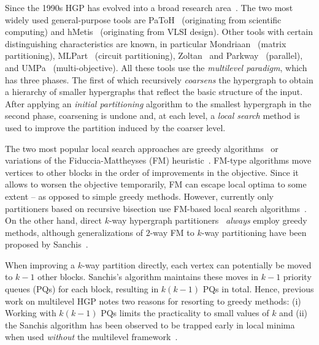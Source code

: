 \documentclass[runningheads,a4paper]{llncs}
\begin{document}
Since the 1990s HGP has evolved into a broad research area~\cite{Alpert19951,DBLP:conf/dimacs/2012,Papa2007}. 
The two most widely used general-purpose tools are PaToH~\cite{PaToH} (originating from scientific computing) 
and hMetis~\cite{hMetisRB,hMetisKway} (originating from VLSI design). 
Other tools with certain distinguishing characteristics are known, in particular Mondriaan~\cite{Mondriaan} (matrix 
partitioning), MLPart~\cite{MLPart} (circuit partitioning), Zoltan~\cite{Zoltan} and Parkway~\cite{Parkway2.0} (parallel), 
and UMPa~\cite{DBLP:conf/dimacs/CatalyurekDKU12} (multi-objective).
All these tools use the \emph{multilevel paradigm}, which  has three phases. The first of which recursively \emph{coarsens} 
the hypergraph to obtain a hierarchy of smaller hypergraphs that reflect the basic structure of the input. After 
applying an \emph{initial partitioning} algorithm to the smallest hypergraph in the second phase, coarsening is 
undone and, at each level, a \emph{local search} method is used to improve the partition induced by the coarser level.

The two most popular local search approaches are greedy algorithms~\cite{hMetisKway,DBLP:conf/dimacs/CatalyurekDKU12} or variations of
the Fiduccia-Mattheyses (FM) heuristic~\cite{FM82}. FM-type algorithms move vertices to other 
blocks in the order of improvements in the objective. Since it allows to worsen the objective temporarily, FM can escape
local optima to some extent -- as opposed to simple greedy methods. However, currently only partitioners based on recursive bisection 
use FM-based local search algorithms~\cite{MLPart,PaToH,Zoltan,hMetisRB,Mondriaan}. On the other hand, direct $k$-way hypergraph 
partitioners~\cite{Aykanat:2008,hMetisKway,Parkway2.0,DBLP:conf/dimacs/CatalyurekDKU12} \emph{always} employ greedy methods, although generalizations of $2$-way FM to $k$-way partitioning have been proposed by Sanchis~\cite{HypergraphKFM}. 

When improving a $k$-way partition directly, each vertex can potentially be moved to $k-1$ other blocks. Sanchis's algorithm maintains these
moves in $k-1$ priority queues (PQs) for each block, resulting in $k(k-1)$ PQs in total.
Hence, previous work on multilevel HGP notes two reasons for resorting to greedy methods: 
(i) Working with $k(k-1)$ PQs limits the practicality to small values of $k$ and (ii) the Sanchis algorithm has been observed to be trapped early in local minima when used \emph{without} the multilevel framework~\cite{flatKFM,hMetisKway}.
\end{document}

